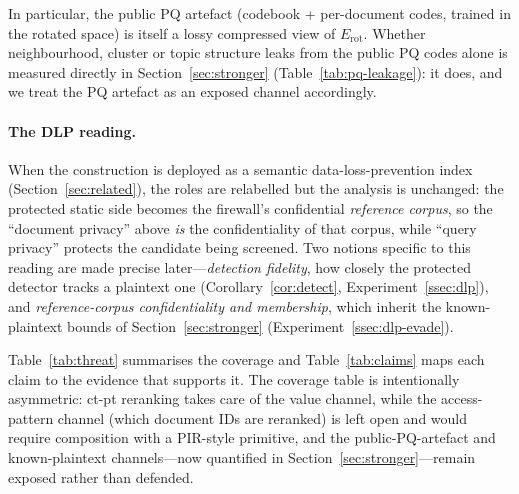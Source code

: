 \documentclass[11pt,a4paper]{article}
\begin{document}
In particular, the public PQ artefact (codebook + per-document codes,
trained in the rotated space) is itself a lossy compressed view of
$E_{\mathrm{rot}}$. Whether neighbourhood, cluster or topic structure
leaks from the public PQ codes alone is measured directly in
Section~\ref{sec:stronger} (Table~\ref{tab:pq-leakage}): it does, and we
treat the PQ artefact as an exposed channel accordingly.

\paragraph{The DLP reading.} When the construction is deployed as a
semantic data-loss-prevention index (Section~\ref{sec:related}), the roles
are relabelled but the analysis is unchanged: the protected static side
becomes the firewall's confidential \emph{reference corpus}, so the
``document privacy'' above \emph{is} the confidentiality of that corpus,
while ``query privacy'' protects the candidate being screened. Two notions
specific to this reading are made precise later---\emph{detection
fidelity}, how closely the protected detector tracks a plaintext one
(Corollary~\ref{cor:detect}, Experiment~\ref{ssec:dlp}), and
\emph{reference-corpus confidentiality and membership}, which inherit the
known-plaintext bounds of Section~\ref{sec:stronger}
(Experiment~\ref{ssec:dlp-evade}).

Table~\ref{tab:threat} summarises the coverage and
Table~\ref{tab:claims} maps each claim to the evidence that supports it.
The coverage table is intentionally asymmetric: ct-pt reranking takes
care of the value channel, while the access-pattern channel (which document
IDs are reranked) is left open and would require composition with a
PIR-style primitive, and the public-PQ-artefact and known-plaintext
channels---now quantified in Section~\ref{sec:stronger}---remain exposed
rather than defended.
\end{document}
